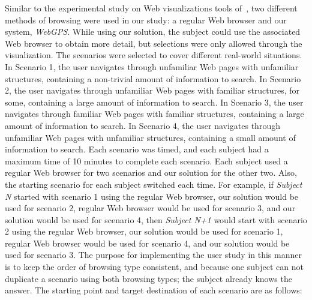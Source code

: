 \documentclass[10pt,psfig]{article}
\begin{document}
{Similar to the experimental study on Web visualizations tools of~\cite{hh-01}, two different methods of browsing were used in our study: a regular Web browser and our system, {\em WebGPS}.
While using our solution, the subject could use the associated Web browser to obtain more detail, but selections were only allowed through the visualization.
The scenarios were selected to cover different real-world situations.
In Scenario 1, the user navigates through unfamiliar Web pages with unfamiliar structures, containing a non-trivial amount of information to search.
In Scenario 2, the user navigates through unfamiliar Web pages with familiar structures, for some, containing a large amount of information to search.
In Scenario 3, the user navigates through familiar Web pages with familiar structures, containing a large amount of information to search.
In Scenario 4, the user navigates through unfamiliar Web pages with unfamiliar structures, containing a small amount of information to search.
Each scenario was timed, and each subject had a maximum time of 10 minutes to complete each scenario.
Each subject used a regular Web browser for two scenarios and our solution for the other two.
Also, the starting scenario for each subject switched each time.  For example, if {\em Subject N} started with scenario 1 using the regular Web browser, our solution would be used for scenario 2, regular Web browser would be used for scenario 3, and our solution would be used for scenario 4, then {\em Subject N+1} would start with scenario 2 using the regular Web browser, our solution would be used for scenario 1, regular Web browser would be used for scenario 4, and our solution would be used for scenario 3.
The purpose for implementing the user study in this manner is to keep the order of browsing type consistent, and because one subject can not duplicate a scenario using both browsing types; the subject already knows the answer.
The starting point and target destination of each scenario are as follows:


}
\end{document}
